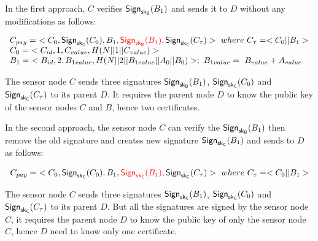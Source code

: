	In the first approach, $C$ verifies $\textsf{Sign}_{\sf{sk}_{B}}(B_{1})$ and sends it to $D$ without any modifications as follows:
	\begin{footnotesize}
		\begin{equation}	
			\begin{array}{l}
				C_{pay} =\ <C_{0},\textsf{Sign}_{\sf{sk}_{C}}(C_{0}),B_{1},\textcolor{red}{\textsf{Sign}_{\sf{sk}_{B}}(B_{1})}, \textsf{Sign}_{\sf{sk}_{C}}(C_{\tau})>\ where\ C_{\tau} = <C_{0} || B_{1}>\\
				C_{0} =\ <C_{id}, 1, C_{value}, H(N||1||C_{value})>\\
				B_{1} =\ <B_{id}, 2, B_{1value}, H(N||2||B_{1value}||A_{0}||B_{0})>;\ B_{1value} =\ B_{value} + A_{value}
			\end{array}
			\label{eq:forwarding-payload-without-resigning}
		\end{equation}
	\end{footnotesize}
	The sensor node $C$ sends three signatures $\textsf{Sign}_{\sf{sk}_{B}}(B_{1})$, $\textsf{Sign}_{\sf{sk}_{C}}(C_{0}) $ and $\textsf{Sign}_{\sf{sk}_{C}}(C_{\tau})$ to its parent $D$.
	It requires the parent node $D$ to know the public key of the sensor nodes $C$ and $B$, hence two certificates.

	In the second approach, the sensor node $C$ can verify the $\textsf{Sign}_{\sf{sk}_{B}}(B_{1})$ then remove the old signature and creates new signature $\textsf{Sign}_{\sf{sk}_{C}}(B_{1})$ and sends to $D$ as follows:
	\begin{footnotesize}
		\begin{equation}	
			\begin{array}{l}
				C_{pay} =\ <C_{0},\textsf{Sign}_{\sf{sk}_{C}}(C_{0}),B_{1},\textcolor{red}{\textsf{Sign}_{\sf{sk}_{C}}(B_{1})}, \textsf{Sign}_{\sf{sk}_{C}}(C_{\tau})>\ where\ C_{\tau} = <C_{0} || B_{1}>\\
			\end{array}
			\label{eq:forwarding-payload-with-resigning}
		\end{equation}
	\end{footnotesize}
	The sensor node $C$ sends three signatures $\textsf{Sign}_{\sf{sk}_{C}}(B_{1})$, $\textsf{Sign}_{\sf{sk}_{C}}(C_{0}) $ and $\textsf{Sign}_{\sf{sk}_{C}}(C_{\tau})$ to its parent $D$.
	But all the signatures are signed by the sensor node $C$, it requires the parent node $D$ to know the public key of only the sensor node $C$, hence $D$ need to know only one certificate.

